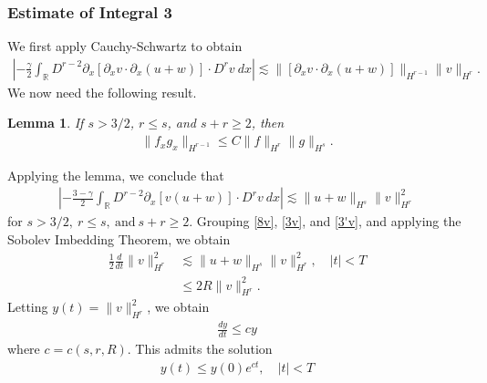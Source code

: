 \documentclass[12pt,reqno]{amsart}
\numberwithin{equation}{section}  %
\numberwithin{figure}{section}
\newcommand{\rr}{\mathbb{R}}
\newcommand{\p}{\partial}
\newtheorem{lemma}[theorem]{Lemma}
\begin{document}
\subsubsection{Estimate of Integral 3} We first apply
Cauchy-Schwartz to obtain
%
%
\begin{equation*}
\begin{split}
\left | - \frac{\gamma}{2} \int_{\rr} D^{r 
-2} \p_x [ \p_x v
\cdot \p_x (u+w)]\cdot D^r v \ dx \right | 
 \lesssim 
\|[\p_x v \cdot \p_x (u+w)] \|_{H^{r -1}}
\|v\|_{H^r}.
\end{split}
\end{equation*}
%
We now need the following result.
%
%
%
\begin{lemma}
\label{impo}
If  $s > 3/2$, $r \le s$, and $s + r \ge 2$,  then
%
%
\begin{equation}
\begin{split}
  \|f_{x}g_{x}\|_{H^{r - 1}} \le C \|f\|_{H^{r}}
\|g\|_{H^{s}}.
\label{11}
\end{split}
\end{equation}
%
%
\end{lemma}
%
Applying the lemma, we conclude that
%
\begin{equation}
\begin{split}
\left | - \frac{3-\gamma}{2} \int_{\rr}  D^{r -2}
\p_x[v(u+w)] \cdot
D^r v \ dx  \right |
 \lesssim \|u+w \|_{H^{s}}
\|v\|_{H^r}^2
\label{3'v}
\end{split}
\end{equation}
%
%
for $s > 3/2, \ r \le s, \ \text{and} \ s + r \ge 2$.
%
%
%
%
Grouping \eqref{8v}, \eqref{3v}, and \eqref{3'v}, and 
applying
the Sobolev Imbedding Theorem, we obtain
%
%
\begin{equation}
\begin{split}
\frac{1}{2} \frac{d}{dt}
\|v\|_{H^r}^2
& \lesssim \|u+w\|_{H^s}
\|v\|_{H^r}^2, \quad | t | < T
\\
& \le 2R \| v \|_{H^{r}}^{2}.
\label{9v}
\end{split}
\end{equation}
%
%
%
%
%
Letting $y(t) = \| v \|^{2}_{H^{r}}$, we obtain
%
%
%
\begin{equation*}
\begin{split}
  \frac{dy}{dt} \le cy
\end{split}
\end{equation*}
%
where $c = c(s, r, R)$. 
This admits the solution
%
%
\begin{equation*}
\begin{split}
  y(t) \le y(0) e^{ct}, \quad | t | < T
\end{split}
\end{equation*}
\end{document}
